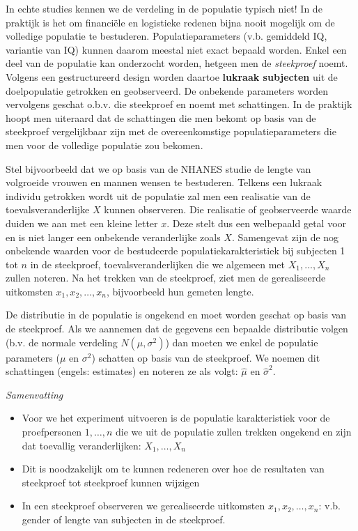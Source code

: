 \documentclass[
  12pt,dutch,coursenotes]{book}
\theoremstyle{definition}
\theoremstyle{definition}
\theoremstyle{definition}
\theoremstyle{remark}
\begin{document}
In echte studies kennen we de verdeling in de populatie typisch niet!
In de praktijk is het om financiële en logistieke redenen bijna nooit mogelijk om de
volledige populatie te bestuderen. Populatieparameters (v.b. gemiddeld IQ, variantie van IQ) kunnen daarom meestal
niet exact bepaald worden. Enkel een deel van de populatie kan onderzocht
worden, hetgeen men de \emph{steekproef} noemt. Volgens een
gestructureerd design worden daartoe \textbf{lukraak subjecten} uit de doelpopulatie
getrokken en geobserveerd. De onbekende parameters worden vervolgens geschat
o.b.v. die steekproef en noemt met schattingen. In de praktijk hoopt men uiteraard dat de schattingen die men bekomt op basis van de steekproef vergelijkbaar zijn met de overeenkomstige populatieparameters die men voor de volledige populatie zou bekomen.

Stel bijvoorbeeld dat we op basis van de NHANES studie de lengte van volgroeide vrouwen en mannen wensen te bestuderen.
Telkens een lukraak individu getrokken wordt uit de populatie zal men een
realisatie van de toevalsveranderlijke \(X\) kunnen observeren. Die realisatie
of geobserveerde waarde duiden we aan met een kleine letter \(x\). Deze stelt
dus een welbepaald getal voor en is niet langer een onbekende veranderlijke
zoals \(X\). Samengevat zijn de nog onbekende waarden voor de
bestudeerde populatiekarakteristiek bij subjecten 1 tot \(n\) in de
steekproef, toevalsveranderlijken die we algemeen met \(X_1,...,X_n\)
zullen noteren. Na het trekken van de steekproef, ziet men de gerealiseerde
uitkomsten \(x_1, x_2, \dots, x_n\), bijvoorbeeld hun gemeten lengte.

De distributie in de populatie is ongekend en moet worden geschat op basis van de steekproef. Als we aannemen dat de gegevens een bepaalde distributie volgen (b.v. de normale verdeling \(N(\mu,\sigma^2)\)) dan moeten we enkel de populatie parameters (\(\mu\) en \(\sigma^2\)) schatten op basis van de steekproef. We noemen dit schattingen (engels: estimates) en noteren ze als volgt: \(\hat \mu\) en \(\hat \sigma^2\).

\emph{Samenvatting}

\begin{itemize}
\item
  Voor we het experiment uitvoeren is de populatie karakteristiek voor de proefpersonen \(1,\ldots,n\) die we uit de populatie zullen trekken ongekend en zijn dat toevallig veranderlijken: \(X_1, \ldots, X_n\)
\item
  Dit is noodzakelijk om te kunnen redeneren over hoe de resultaten van steekproef tot steekproef kunnen wijzigen
\item
  In een steekproef observeren we gerealiseerde uitkomsten \(x_1, x_2, \dots, x_n\): v.b. gender of lengte van subjecten in de steekproef.
\end{itemize}
\end{document}
